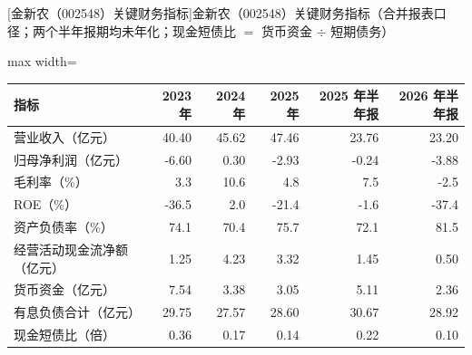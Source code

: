\begin{center}\small\setlength{\tabcolsep}{3.4pt}
[金新农（002548）关键财务指标]{金新农（002548）关键财务指标（合并报表口径；两个半年报期均未年化；现金短债比 $=$ 货币资金 $\div$ 短期债务）}
\begin{adjustbox}{max width=\textwidth}
\begin{tabular}{@{}lrrrrr@{}}
\toprule
指标 & 2023 年 & 2024 年 & 2025 年 & 2025 年半年报 & 2026 年半年报 \\
\midrule
营业收入（亿元） & 40.40 & 45.62 & 47.46 & 23.76 & 23.20 \\
归母净利润（亿元） & -6.60 & 0.30 & -2.93 & -0.24 & -3.88 \\
毛利率（\%） & 3.3 & 10.6 & 4.8 & 7.5 & -2.5 \\
ROE（\%） & -36.5 & 2.0 & -21.4 & -1.6 & -37.4 \\
资产负债率（\%） & 74.1 & 70.4 & 75.7 & 72.1 & 81.5 \\
经营活动现金流净额（亿元） & 1.25 & 4.23 & 3.32 & 1.45 & 0.50 \\
货币资金（亿元） & 7.54 & 3.38 & 3.05 & 5.11 & 2.36 \\
有息负债合计（亿元） & 29.75 & 27.57 & 28.60 & 30.67 & 28.92 \\
现金短债比（倍） & 0.36 & 0.17 & 0.14 & 0.22 & 0.10 \\
\bottomrule
\end{tabular}
\end{adjustbox}
\end{center}

